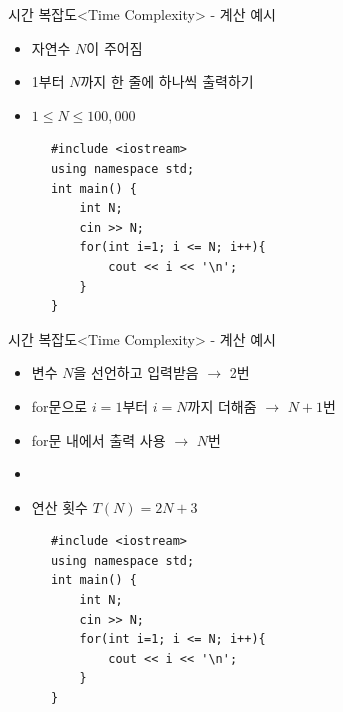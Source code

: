 \begin{frame}[fragile]{시간 복잡도}{<Time Complexity> - 계산 예시}
  \begin{center}
  \end{center}
  \vspace{2mm}
  \begin{twocol}
    \begin{itemize}
      \item 자연수 $N$이 주어짐
      \item 1부터 $N$까지 한 줄에 하나씩 출력하기
    \end{itemize}
    \vspace{3mm}
    \begin{itemize}
      \item $1 \le N \le 100{,}000$
    \end{itemize}
  \colsplit
    \begin{verbatim}
      #include <iostream>
      using namespace std;
      int main() {
          int N;
          cin >> N;
          for(int i=1; i <= N; i++){
              cout << i << '\n';
          }
      }
    \end{verbatim}
  \end{twocol}
\end{frame}

\begin{frame}[fragile]{시간 복잡도}{<Time Complexity> - 계산 예시}
  \begin{center}
  \end{center}
  \vspace{2mm}
  \begin{twocol}
    \begin{itemize}
      \item 변수 $N$을 선언하고 입력받음 $\to$ 2번
      \item for문으로 $i=1$부터 $i=N$까지 더해줌 $\to$ $N+1$번
      \item for문 내에서 출력 사용 $\to$ $N$번
      \item[] \vspace{1mm}
      \item 연산 횟수 $T(N) = 2N+3$
    \end{itemize}
  \colsplit
    \begin{verbatim}
      #include <iostream>
      using namespace std;
      int main() {
          int N;
          cin >> N;
          for(int i=1; i <= N; i++){
              cout << i << '\n';
          }
      }
    \end{verbatim}
  \end{twocol}
\end{frame}

